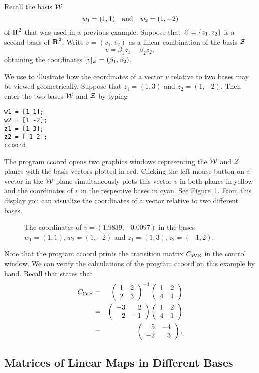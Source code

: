 Recall the basis ${\cal W}$
\[
w_1=(1,1) \quad\mbox{and}\quad w_2=(1,-2)
\]
of $\mbox{$\bf{R}$}^2$ that was used in a previous example.  Suppose that
${\cal Z}=\{z_1,z_2\}$ is a second basis of $\mbox{$\bf{R}$}^2$.  Write $v=(v_1,v_2)$
as a linear combination of the basis ${\cal Z}$
\[
v=\beta_1z_1 + \beta_2z_2,
\]
obtaining the coordinates $[v]_{\cal Z}=(\beta_1,\beta_2)$.

We use \Matlab to illustrate how the coordinates of a vector $v$ relative
to two bases may be viewed geometrically.  Suppose that $z_1=(1,3)$ and
$z_2=(1,-2)$.  Then enter the two bases ${\cal W}$ and ${\cal Z}$ by typing
\begin{verbatim}
w1 = [1 1];
w2 = [1 -2];
z1 = [1 3];
z2 = [-1 2];
ccoord
\end{verbatim}


The \Matlab program {\sf ccoord} opens two
graphics windows
representing the ${\cal W}$ and ${\cal Z}$ planes with the basis
vectors plotted in red.  Clicking the left mouse button on a
vector in the ${\cal W}$ plane simultaneously plots this vector
$v$ in both planes in yellow and the coordinates of $v$ in the
respective bases in cyan.  See Figure~\ref{F:2coords}.  From
this display you can visualize the coordinates of a
vector relative to two different bases.

\begin{figure}[htb]
     \centerline{%
	}
     \caption{The coordinates of $v=(1.9839,-0.0097)$ in the bases
	$w_1=(1,1), w_2=(1,-2)$ and $z_1=(1,3),z_2=(-1,2)$.}
     \label{F:2coords}
\end{figure}

Note that the program {\sf ccoord} prints the transition matrix
$C_{\cal WZ}$ in the \Matlab control window.  We can verify the
calculations of the program {\sf ccoord} on this example by hand.
Recall that  states that
\begin{eqnarray*}
C_{\cal WZ} & = & \left(\begin{array}{rr} 1 & 2\\ 2 &3\end{array}\right)^{-1}\left(\begin{array}{rr} 1 & 2\\ 4 &1\end{array}\right) \\
& = & \left(\begin{array}{rr} -3 & 2\\ 2 &-1\end{array}\right)\left(\begin{array}{rr} 1 & 2\\ 4 &1\end{array}\right) \\
& = & \left(\begin{array}{rr} 5 & -4\\ -2 &3\end{array}\right).
\end{eqnarray*}


\subsection*{Matrices of Linear Maps in Different Bases}

